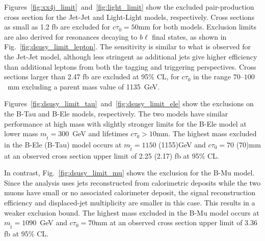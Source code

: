 Figures~\ref{fig:xx4j_limit}~and~\ref{fig:light_limit} show the
excluded pair-production cross section for the Jet-Jet and Light-Light
models, respectively. Cross sections as small as 1.2 fb are excluded
for $c\tau_0=50$mm for both models. 
Exclusion limits are also derived for resonances decaying to $b\ell$
final states, as shown in Fig.~\ref{fig:dsusy_limit_lepton}. The
sensitivity is similar to what is observed for the Jet-Jet model,
although less stringent as additional jets give higher efficiency than
additional leptons from both the tagging and triggering
perspectives. Cross sections larger than 2.47 fb are excluded at 95\%
CL, for $c\tau_0$ in the range $70$--$100$~mm excluding a
parent mass value of 1135~GeV.  

Figures~\ref{fig:dsusy_limit_tau}~and~\ref{fig:dsusy_limit_ele} show
the exclusions on the B-Tau and B-Ele models, respectively. The two
models have similar performance at high mass  with slightly stronger limits 
for the B-Ele model at lower
mass $m_{\tilde{t}}=300$~GeV and lifetimes $c\tau_0>10$mm. The
highest mass excluded in the B-Ele (B-Tau) model occurs at
$m_{\tilde{t}}=1150$ (1155)GeV and $c\tau_0=70$ (70)mm at an
observed cross section upper limit of 2.25 (2.17) fb at 95\% CL.

In contrast, Fig.~\ref{fig:dsusy_limit_mu} shows the exclusion for the
B-Mu model. Since the analysis uses jets reconstructed from
calorimetric deposits while the two muons have small or no associated
calorimeter deposit, the signal reconstruction efficiency and
displaced-jet multiplicity are smaller in this case. This results in a
weaker exclusion bound.  The highest mass excluded in the B-Mu model
occurs at $m_{\tilde{t}}=1090$~GeV and $c\tau_0=70$mm at an
observed cross section upper limit of 3.36 fb at 95\% CL.

